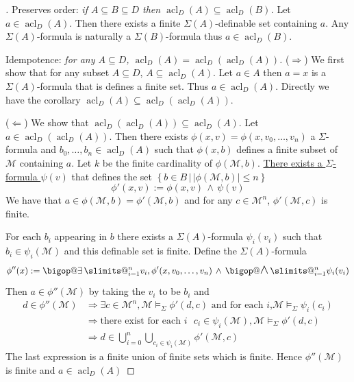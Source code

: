 \documentclass{book}
\makeatletter
\renewcommand{\implies}{\Rightarrow}
\newcommand{\limplies}{\Leftarrow}
\newcommand{\AND}{\, \land \,}
\newenvironment{forward}{($\implies$)}{}
\newenvironment{backward}{($\limplies$)}{}
\DeclareRobustCommand\bigop[1]{%
  \mathop{\vphantom{\sum}\mathpalette\bigop@{#1}}\slimits@
}
\newcommand{\bigop@}[2]{%
  \vcenter{%
    \sbox\z@{$#1\sum$}%
    \hbox{\resizebox{
      \ifx#1\displaystyle.7\fi\dimexpr\ht\z@+\dp\z@}{!}{$\m@th#2$}}%
  }%
}
\newcommand{\bigexists}[2]{\DOTSB\bigop{\exists}_{#1}^{#2}}
\newcommand{\bigand}[2]{\DOTSB\bigop{\mbox{\Large$\land$}}_{#1}^{#2}}
\newcommand{\set}[1]{\left\{#1\right\}}
\newcommand{\st}{\,|\,}
\newcommand{\subs}{\subseteq}
\newcommand{\Si}{\Sigma}
\newcommand{\MM}{\mathcal{M}}
\newcommand{\abs}[1]{\left\vert #1 \right\vert}
\newcommand{\<}{\langle}
\renewcommand{\>}{\rangle}
\newcommand{\model}[1]{\vDash_{#1}}
\DeclareMathOperator{\acl}{\mathrm{acl}}
\newcommand{\linkto}[2]{\hyperlink{#1}{#2}}
\theoremstyle{definitionstyle}
\theoremstyle{exercisestyle}
\theoremstyle{remarkstyle}
\makeatother
\begin{document}
\begin{proof}[\cite{fandom}]
    Preserves order: 
    \emph{if $A \subs B \subs D$ then $\acl_D(A) \subs \acl_D(B)$.}
    Let $a \in \acl_D(A)$. 
    Then there exists a finite $\Si(A)$-definable set containing $a$.
    Any $\Si(A)$-formula is naturally a $\Si(B)$-formula thus $a \in \acl_D(B)$.

    Idempotence: \emph{for any $A \subs D$, $\acl_D(A) = \acl_D(\acl_D(A))$.}
    \begin{forward}
        We first show that for any subset $A \subs D$, $A \subs \acl_D(A)$.
        Let $a \in A$ then $a = x$ is a $\Si(A)$-formula that is defines a 
        finite set. 
        Thus $a \in \acl_D(A)$.
        Directly we have the corollary $\acl_D(A) \subs \acl_D(\acl_D(A))$.
    \end{forward}

    \begin{backward}
        We show that $\acl_D(\acl_D(A)) \subs \acl_D(A)$.
        Let $a \in \acl_D(\acl_D(A))$.
        Then there exists $\phi(x,v) = \phi(x,v_0,\dots,v_n)$ a $\Si$-formula 
        and $b_0,\dots, b_n \in \acl_D(A)$ such that $\phi(x,b)$
        defines a finite subset of $\MM$ containing $a$.
        Let $k$ be the finite cardinality of $\phi(\MM,b)$.
        \linkto{some_definable_sets}{There exists a $\Si$-formula $\psi(v)$} 
        that defines the set 
        $\set{b \in B \st \abs{\phi(\MM,b)} \leq n}$
        \[
            \phi'(x,v) := \phi(x,v) \AND \psi(v)
        \]
        We have that $a \in \phi(\MM,b) = \phi'(\MM,b)$
        and for any $c \in \MM^n$, $\phi'(\MM,c)$ is finite.
    
        For each $b_i$ appearing in $b$
        there exists a $\Si(A)$-formula $\psi_i(v_i)$ such that 
        $b_i \in \psi_i(\MM)$ and this definable set is finite.
        Define the $\Si(A)$-formula
        \[
            \phi''(x) := \bigexists{i = 1}{n} v_i,
            \phi'(x,v_0,\dots,v_n) \AND \bigand{i = 1}{n} \psi_i(v_i)
        \]
        Then $a \in \phi''(\MM)$ by taking the $v_i$ to be $b_i$ and 
        \begin{align*}
            d \in \phi''(\MM) 
            &\implies \exists c \in \MM^n, \MM \model{\Si}\phi'(d,c) 
            \text{ and for each $i$,} \MM \model{\Si}\psi_i(c_i)\\
            &\implies \text{there exist for each $i$ } c_i \in \psi_i(\MM),
            \MM \model{\Si}\phi'(d,c) \\
            &\implies d \in 
            \bigcup_{i = 0}^n \bigcup_{c_i \in \psi_i(\MM)} \phi'(\MM,c)
        \end{align*}
        The last expression is a finite union of finite sets which is finite.
        Hence $\phi''(\MM)$ is finite and $a \in \acl_D(A)$
    \end{backward}
    

\end{proof}
\end{document}
